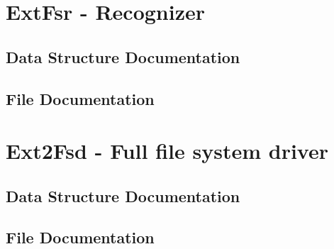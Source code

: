 { %
\setlength{\parindent}{0cm}
\setlength{\parskip}{0.2cm}
\sloppy

\chapter{ExtFsr - Recognizer}
\label{cha:extfsr}
\section{Data Structure Documentation}




\section{File Documentation}




\chapter{Ext2Fsd - Full file system driver}
\label{cha:ext2fsd}
\section{Data Structure Documentation}





\section{File Documentation}











} %